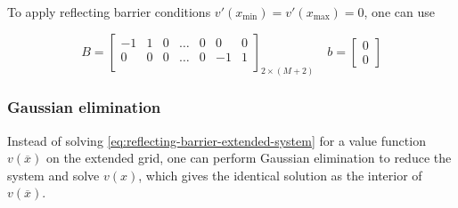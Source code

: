 \documentclass[11pt]{article}
\theoremstyle{definition}
\begin{document}
To apply reflecting barrier conditions $v'(x_{\min}) = v'(x_{\max}) = 0$, one can use

\begin{equation}\label{eq:reflecting-barrier-matrix}
B = \begin{bmatrix}
-1 & 1 & 0 & \dots & 0 & 0 & 0 \\
0 & 0 & 0 & \dots & 0 & -1 & 1\\
\end{bmatrix}_{2 \times (M+2)} \quad 
b = \begin{bmatrix}
0 \\
0
\end{bmatrix}
\end{equation}

\subsubsection{Gaussian elimination}
Instead of solving \eqref{eq:reflecting-barrier-extended-system} for a value function $v(\overline{x})$ on the extended grid, one can perform Gaussian elimination to reduce the system and solve $v(x)$, which gives the identical solution as the interior of $v(\overline{x})$. 
\end{document}
